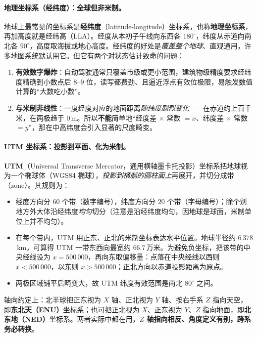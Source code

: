 \paragraph{地理坐标系（经纬度）：全球但非米制。}
地球上最常见的坐标系是\textbf{经纬度}（latitude-longitude）坐标系，也称\textbf{地理坐标系}，再加高度就是经纬高（LLA）\cite{gao2023slamad}。经度从本初子午线向东西各 $180^\circ$，纬度从赤道向南北各 $90^\circ$，高度取海拔或地心高度。经纬度的好处是\emph{覆盖整个地球}、直观通用，许多地图系统默认用它。但它有两个对状态估计致命的问题\cite{gao2023slamad}：
\begin{enumerate}
  \item \textbf{有效数字爆炸}：自动驾驶通常只覆盖市级或更小范围，建筑物级精度要求经纬度精确到小数点后 $8$–$9$ 位，读写都费劲、且逼近浮点有效位极限，易触发数值计算的“大数吃小数”。
  \item \textbf{与米制非线性}：一度经度对应的地面距离\emph{随纬度剧烈变化}——在赤道约上百千米，在两极趋于 $0$\,m。所以\textbf{不能}简单地“经度差 $\times$ 常数 $= x$、纬度差 $\times$ 常数 $= y$”，那在中高纬度会引入显著的尺度畸变。
\end{enumerate}

\paragraph{UTM 坐标系：投影到平面、化为米制。}
\textbf{UTM}（Universal Transverse Mercator，通用横轴墨卡托投影）坐标系把地球视为一个椭球体（WGS84 椭球），\emph{投影到横躺的圆柱面上}再展开，并切分成带（zone）\cite{gao2023slamad}。其规则为：
\begin{itemize}
  \item 经度方向分 $60$ 个带（数字编号），纬度方向分 $20$ 个带（字母编号）；除个别地方外大体沿经纬度\emph{均匀}切分（注意是沿经纬度均匀，因地球是球面，米制单位上并不均匀）。
  \item 在每个带内，UTM 用正东、正北的米制坐标表达水平位置。地球半径约 $6\,378$\,km，可算得 UTM 一带东西向最宽约 $66.7$\,万米。为避免负坐标，把该带的中央经线设为 $x=500\,000$，再向东取偏移量：点落在中央经线以西则 $x<500\,000$，以东则 $x>500\,000$；正北方向以赤道投影距离为原点。
  \item 两极区域铺平后畸变大，故 UTM 纬度有效范围是南北 $80^\circ$ 之间\cite{gao2023slamad}。
\end{itemize}
轴向约定上：北半球把正东视为 $X$ 轴、正北视为 $Y$ 轴、按右手系 $Z$ 指向天空，即\textbf{东北天（ENU）}坐标系；也可把正北视为 $X$、正东视为 $Y$、$Z$ 指向地面，即\textbf{北东地（NED）}坐标系。两者实际中都在用，\textbf{$Z$ 轴指向相反、角度定义有别，跨系务必转换}\cite{gao2023slamad}。

